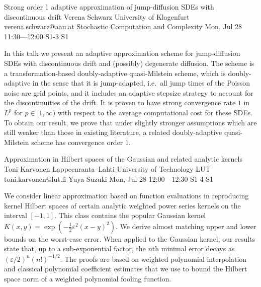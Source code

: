 \begin{talk}
  {Strong order 1 adaptive approximation of jump-diffusion SDEs with discontinuous drift}%
  {Verena Schwarz}%
  {University of Klagenfurt}%
  {verena.schwarz@aau.at}%
  {Stochastic Computation and Complexity}%
  {}%
  {Mon, Jul 28 11:30---12:00}%
  {S1-3}%
  {S1}%
    

In this talk we present an adaptive approximation scheme for jump-diffusion SDEs with discontinuous drift and (possibly) degenerate diffusion. The scheme is a transformation-based doubly-adaptive quasi-Milstein scheme, which 
is doubly-adaptive in the sense that it is jump-adapted, i.e.~all jump times of the Poisson noise are grid points, and it includes an adaptive stepsize strategy to account for the discontinuities of the drift. It is proven to have strong convergence rate $1$ in $L^p$ for $p\in[1,\infty)$ with respect to the average computational cost for these SDEs. 
To obtain our result, we prove that under slightly stronger assumptions which are still weaker than those in existing literature, a related doubly-adaptive quasi-Milstein scheme has convergence order $1$. 
\end{talk}

\begin{talk}
  {Approximation in Hilbert spaces of the Gaussian and related analytic kernels}%
  {Toni Karvonen}%
  {Lappeenranta--Lahti University of Technology LUT}%
  {toni.karvonen@lut.fi}%
  {Yuya Suzuki}%
  {}%
  {Mon, Jul 28 12:00---12:30}%
  {S1-4}%
  {S1}%
  
    
   

\medskip

We consider linear approximation based on function evaluations in reproducing
kernel Hilbert spaces of certain analytic weighted power series kernels on the interval $[-1, 1]$. This class contains the popular Gaussian kernel $K(x, y) = \exp(-\frac{1}{2} \varepsilon^2(x-y)^2)$.
We derive almost matching upper and lower bounds on the worst-case error. When applied to
the Gaussian kernel, our results state that, up to a sub-exponential factor, the
$n$th minimal error decays as $(\varepsilon/2)^n (n!)^{-1/2}$. The proofs are based on weighted
polynomial interpolation and classical polynomial coefficient estimates that we use
to bound the Hilbert space norm of a weighted polynomial fooling function.
\end{talk}

